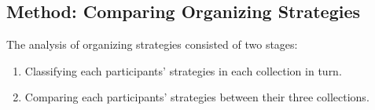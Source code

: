 


\newpage
\subsection{Method: Comparing Organizing Strategies}
\label{exp-study:cross-tool-profiling}

The analysis of organizing strategies consisted of two stages:
\begin{enumerate}
	\item Classifying each participants' strategies in each collection in turn.
	\item Comparing each participants' strategies between their three collections.
\end{enumerate}

